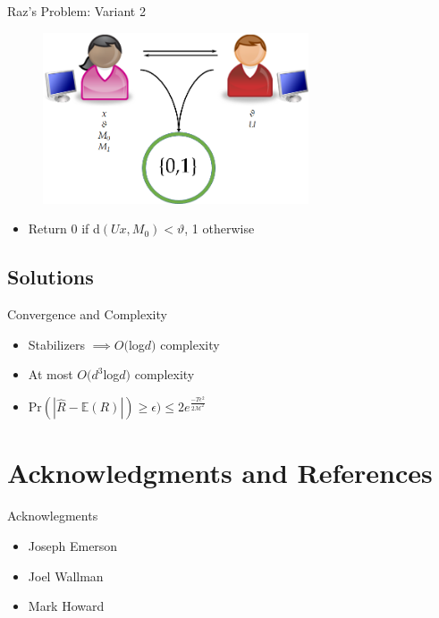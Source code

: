 \documentclass{beamer}
\begin{document}
\begin{frame}{Raz's Problem: Variant 2}
\begin{figure}[!h]
\includegraphics[width=0.7\textwidth]{Raz_prob2.png}
\end{figure}
\begin{itemize}
\item Return 0 if d$(Ux, M_0) < \vartheta$, 1 otherwise
\end{itemize}
\end{frame}

\subsection{Solutions}
\begin{frame}{Convergence and Complexity}
\begin{itemize}
\item<2-> Stabilizers $\implies O($log$d)$ complexity
\item<3-> At most $O(d^3$log$d)$ complexity
\item<4-> $\text{Pr}(|\hat{R} - \mathbb{E}(R)|) \ge \epsilon) \le 2e^{\frac{-T\epsilon^2}{2\mathcal{M}^2}}$
\end{itemize}
\end{frame}

\section{Acknowledgments and References}
\begin{frame}{Acknowlegments}
\begin{itemize}
\item Joseph Emerson
\item Joel Wallman
\item Mark Howard
\end{itemize}
\end{frame}
\end{document}

